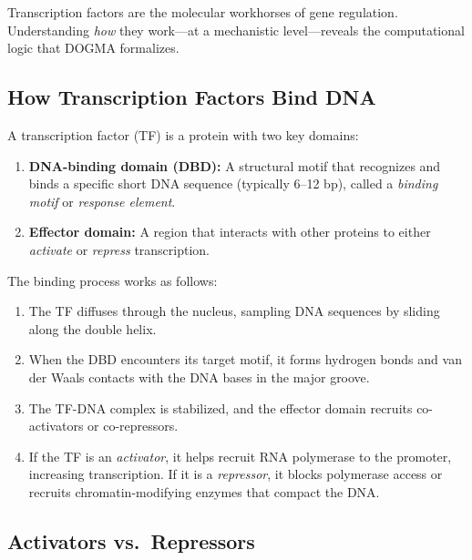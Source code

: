 Transcription factors are the molecular workhorses of gene regulation. Understanding \emph{how} they work---at a mechanistic level---reveals the computational logic that DOGMA formalizes.

\subsection{How Transcription Factors Bind DNA}

A transcription factor (TF) is a protein with two key domains:

\begin{enumerate}[leftmargin=1.8em]
  \item \textbf{DNA-binding domain (DBD):} A structural motif that recognizes and binds a specific short DNA sequence (typically 6--12 bp), called a \emph{binding motif} or \emph{response element}.
  \item \textbf{Effector domain:} A region that interacts with other proteins to either \emph{activate} or \emph{repress} transcription.
\end{enumerate}

The binding process works as follows:
\begin{enumerate}[leftmargin=1.8em]
  \item The TF diffuses through the nucleus, sampling DNA sequences by sliding along the double helix.
  \item When the DBD encounters its target motif, it forms hydrogen bonds and van der Waals contacts with the DNA bases in the major groove.
  \item The TF-DNA complex is stabilized, and the effector domain recruits co-activators or co-repressors.
  \item If the TF is an \emph{activator}, it helps recruit RNA polymerase to the promoter, increasing transcription. If it is a \emph{repressor}, it blocks polymerase access or recruits chromatin-modifying enzymes that compact the DNA.
\end{enumerate}

\subsection{Activators vs.\ Repressors}

